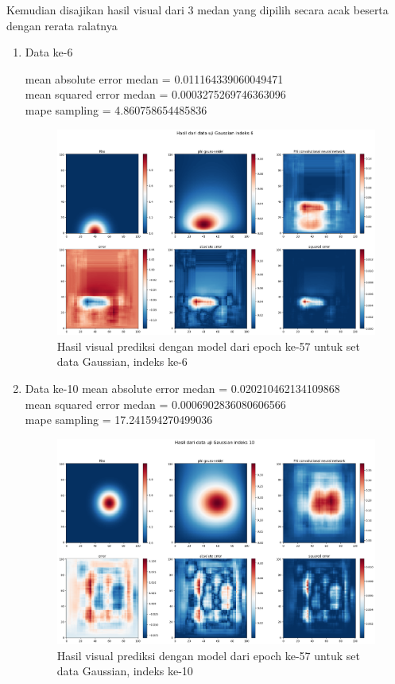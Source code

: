 Kemudian disajikan hasil visual dari 3 medan yang dipilih secara acak beserta dengan rerata ralatnya
\begin{enumerate}
    \item Data ke-6
    
    mean absolute error medan =  0.011164339060049471\\
    mean squared error medan =  0.0003275269746363096\\
    mape sampling =  4.860758654485836
    \begin{figure}[h!]
    \centering
    \includegraphics[width=12cm]{gambar/6_57_gaussian.png}
    \caption{Hasil visual prediksi dengan model dari epoch ke-57 untuk set data Gaussian, indeks ke-6}
    \label{0_57_acak}
    \end{figure}

    \item Data ke-10
    mean absolute error medan = 0.020210462134109868\\
    mean squared error medan = 0.0006902836080606566\\
    mape sampling =  17.241594270499036
    \begin{figure}[h!]
    \centering
    \includegraphics[width=12cm]{gambar/10_57_gaussian.png}
    \caption{Hasil visual prediksi dengan model dari epoch ke-57 untuk set data Gaussian, indeks ke-10}
    \label{10_57_acak}
    \end{figure}


\end{enumerate}
